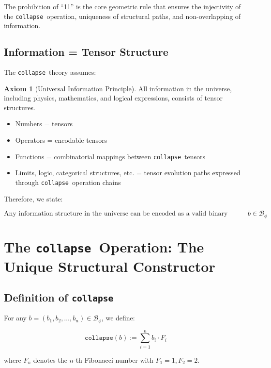 \documentclass[12pt,a4paper]{article}
\theoremstyle{plain}
\theoremstyle{definition}
\newtheorem{axiom}[theorem]{Axiom}
\theoremstyle{remark}
\newcommand{\collapse}{\texttt{collapse}}
\newcommand{\Bphi}{\mathcal{B}_\phi}
\begin{document}
The prohibition of ``11'' is the core geometric rule that ensures the injectivity of the \collapse\ operation, uniqueness of structural paths, and non-overlapping of information.

\subsection{Information = Tensor Structure}

The \collapse\ theory assumes:

\begin{axiom}[Universal Information Principle]
All information in the universe, including physics, mathematics, and logical expressions, consists of tensor structures.
\end{axiom}

\begin{itemize}
\item Numbers = tensors
\item Operators = encodable tensors
\item Functions = combinatorial mappings between \collapse\ tensors
\item Limits, logic, categorical structures, etc. = tensor evolution paths expressed through \collapse\ operation chains
\end{itemize}

Therefore, we state:

\begin{equation}
\boxed{
\text{Any information structure in the universe can be encoded as a valid binary tensor } b \in \Bphi
}
\end{equation}

\section{The \collapse\ Operation: The Unique Structural Constructor}

\subsection{Definition of \collapse}

For any $b = (b_1, b_2, \dots, b_n) \in \Bphi$, we define:

\begin{equation}
\collapse(b) := \sum_{i=1}^{n} b_i \cdot F_i
\end{equation}

where $F_n$ denotes the $n$-th Fibonacci number with $F_1 = 1, F_2 = 2$.
\end{document}
